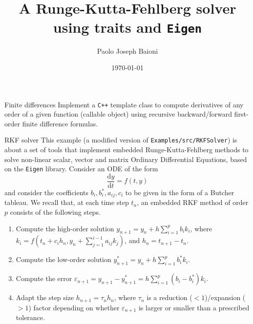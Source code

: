 \documentclass[10pt]{beamer}
\begin{document}
    \title{A Runge-Kutta-Fehlberg solver\protect\\ using traits and \texttt{Eigen}}
    \author{Paolo Joseph Baioni}
    \date{\today}

\begin{frame}
    \maketitle
\end{frame}

\begin{frame}[fragile]{Finite differences}
	Implement a \texttt{C++} template class to compute derivatives of any order of a given function (callable object) using recursive backward/forward first-order finite difference formulas.
\end{frame}

\begin{frame}{RKF solver}
This example (a modified version of \texttt{Examples/src/RKFSolver}) is about a set of tools that implement embedded Runge-Kutta-Fehlberg methods to solve non-linear scalar, vector and matrix Ordinary Differential Equations, based on the \texttt{Eigen} library.
\vfill
Consider an ODE of the form
\begin{equation*}
  \frac{\mathrm{d} y}{\mathrm{d} t} = f(t, y)
\end{equation*}
and consider the coefficients \(b_i, b_i^*, a_{ij}, c_i\) to be given in the form of a Butcher tableau.
We recall that, at each time step \(t_n\), an embedded RKF method of order \(p\) consists of the following steps.
\begin{enumerate}
  \item Compute the high-order solution \(y_{n+1} = y_{n} + h \sum_{i=1}^p b_i k_i\), where \(k_i = f\left(t_n + c_i h_n, y_n + \sum_{j=1}^{i-1}a_{ij}k_j\right)\), and \(h_n = t_{n+1} - t_n\).
  \item Compute the low-order solution \(y_{n+1}^* = y_{n} + h \sum_{i=1}^p b_i^* k_i\).
  \item Compute the error \(\varepsilon_{n+1} = y_{n+1} - y_{n+1}^* = h\sum_{i=1}^p(b_i - b_i^*)k_i\).
  \item Adapt the step size \(h_{n+1} = \tau_{n} h_{n}\), where \(\tau_{n}\) is a reduction (\(<1\))/expansion (\(>1\)) factor depending on whether \(\varepsilon_{n+1}\) is larger or smaller than a prescribed tolerance.
  \end{enumerate}
\end{frame}
\end{document}
